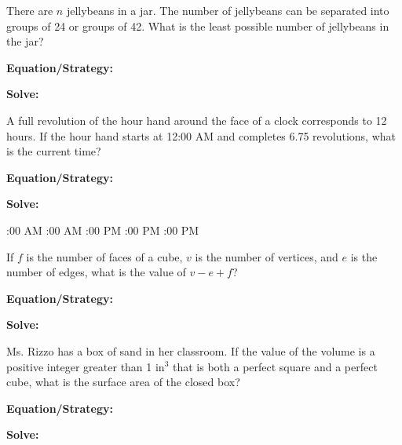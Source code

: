 \vfill
\newpage
\begin{multicols*}{2}
\begin{outline}[enumerate]
\medium

\1 There are $n$ jellybeans in a jar. The number of jellybeans can be separated into groups of 24 or groups of 42. What is the least possible number of jellybeans in the jar?

\bigskip
\textbf{Equation/Strategy:} \hrulefill

\bigskip
\textbf{Solve:}

\vfill
{}

\midline

\1 A full revolution of the hour hand around the face of a clock corresponds to 12 hours. If the hour hand starts at 12:00 AM and completes 6.75 revolutions, what is the current time?

\bigskip
\textbf{Equation/Strategy:} \hrulefill

\bigskip
\textbf{Solve:}

\vfill
{}:00 AM
:00 AM
:00 PM
:00 PM
:00 PM

\columnbreak
\advanced

\1 If $f$ is the number of faces of a cube, $v$ is the number of vertices, and $e$ is the number of edges, what is the value of $v-e+f$?

\bigskip
\textbf{Equation/Strategy:} \hrulefill

\bigskip
\textbf{Solve:}


\midline

\1 Ms. Rizzo has a box of sand in her classroom. If the value of the volume is a positive integer greater than 1 in$^3$ that is both a perfect square and a perfect cube, what is the surface area of the closed box?

\bigskip
\textbf{Equation/Strategy:} \hrulefill

\bigskip
\textbf{Solve:}

\vfill
{}
\end{outline}
\end{multicols*}